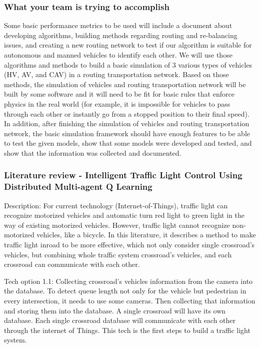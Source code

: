 \documentclass[onecolumn, draftclsnofoot,10pt, compsoc]{IEEEtran}
\begin{document}
\subsubsection{What your team is trying to accomplish}
Some basic performance metrics to be used will include a document about developing algorithms, building methods regarding routing and re-balancing issues, and creating a new routing network to test if our algorithm is suitable for autonomous and manned vehicles to identify each other.
We will use those algorithms and methods to build a basic simulation of 3 various types of vehicles (HV, AV, and CAV) in a routing transportation network.
Based on those methods, the simulation of vehicles and routing transportation network will be built by some software and it will need to be fit for basic rules that enforce physics in the real world (for example, it is impossible for vehicles to pass through each other or instantly go from a stopped position to their final speed).
In addition, after finishing the simulation of vehicles and routing transportation network, the basic simulation framework should have enough features to be able to test the given models, show that some models were developed and tested, and show that the information was collected and documented.
\subsubsection{Literature review - Intelligent Traffic Light Control Using Distributed Multi-agent Q Learning \cite{liu2017intelligent}}
Description: For current technology (Internet-of-Things), traffic light can recognize motorized vehicles and automatic turn red light to green light in the way of existing motorized vehicles.
However, traffic light cannot recognize non-motorized vehicles, like a bicycle.
In this literature, it describes a method to make traffic light inroad to be more effective, which not only consider single crossroad’s vehicles, but combining whole traffic system crossroad’s vehicles, and each crossroad can communicate with each other.

Tech option 1.1: Collecting crossroad’s vehicles information from the camera into the database.
To detect queue length not only for the vehicle but pedestrian in every intersection, it needs to use some cameras.
Then collecting that information and storing them into the database.
A single crossroad will have its own database.
Each single crossroad database will communicate with each other through the internet of Things.
This tech is the first steps to build a traffic light system.
\end{document}
